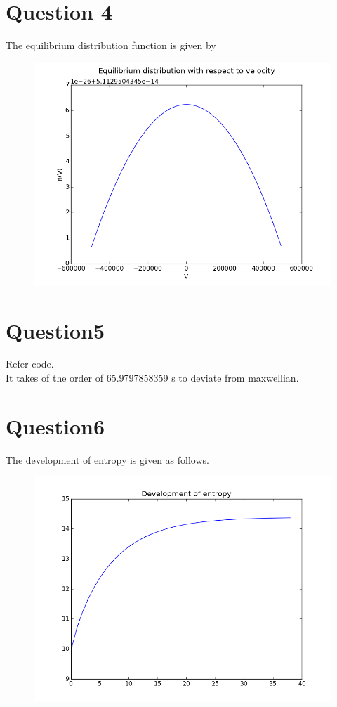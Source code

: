 \documentclass[11pt, a4paper]{article}
\begin{document}
\section{Question 4}
The equilibrium distribution function is given by
\begin{figure}[H]
 \centering
 \includegraphics[width = \textwidth]{q4.png}
\end{figure}

\section{Question5}
Refer code. \\
It takes of the order of 65.9797858359 s to deviate from maxwellian.

\section{Question6}
The development of entropy is given as follows.
\begin{figure}[H]
 \centering
 \includegraphics[width = \textwidth]{q6.png}
\end{figure}
\end{document}
